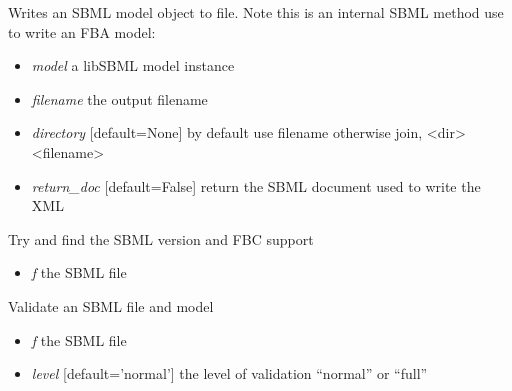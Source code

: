 \documentclass[a4paper,11pt,english]{sphinxmanual}
\begin{document}
\begin{fulllineitems}
\label{modules_doc:cbmpy.CBXML.sbml_exportSBML2FBAModel}
Writes an SBML model object to file. Note this is an internal SBML method use  to write an FBA model:
\begin{itemize}
\item {} 
\emph{model} a libSBML model instance

\item {} 
\emph{filename} the output filename

\item {} 
\emph{directory} {[}default=None{]} by default use filename otherwise join, \textless{}dir\textgreater{}\textless{}filename\textgreater{}

\item {} 
\emph{return\_doc} {[}default=False{]} return the SBML document used to write the XML

\end{itemize}

\end{fulllineitems}


\begin{fulllineitems}
\label{modules_doc:cbmpy.CBXML.sbml_fileFindVersion}
Try and find the SBML version and FBC support
\begin{itemize}
\item {} 
\emph{f} the SBML file

\end{itemize}

\end{fulllineitems}


\begin{fulllineitems}
\label{modules_doc:cbmpy.CBXML.sbml_fileValidate}
Validate an SBML file and model
\begin{itemize}
\item {} 
\emph{f} the SBML file

\item {} 
\emph{level} {[}default='normal'{]} the level of validation ``normal'' or ``full''

\end{itemize}

\end{fulllineitems}
\end{document}
